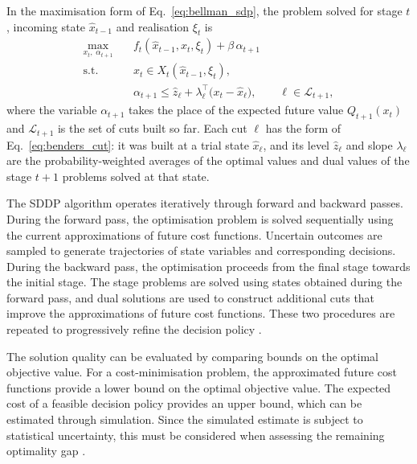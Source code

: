 In the maximisation form of Eq.~\eqref{eq:bellman_sdp}, the problem solved for stage $t$, incoming state $\widehat{x}_{t-1}$ and realisation $\xi_t$ is
\begin{subequations}\label{eq:sddp_stage}
\begin{align}
\max_{x_t,\;\alpha_{t+1}}\quad & f_t(\widehat{x}_{t-1},x_t,\xi_t)+\beta\,\alpha_{t+1}\\
\text{s.t.}\quad & x_t\in X_t(\widehat{x}_{t-1},\xi_t),\\
& \alpha_{t+1}\le\widehat{z}_\ell+\lambda_\ell^{\top}\bigl(x_t-\widehat{x}_\ell\bigr),
\qquad \ell\in\mathcal{L}_{t+1},
\end{align}
\end{subequations}
where the variable $\alpha_{t+1}$ takes the place of the expected future value $Q_{t+1}(x_t)$ and $\mathcal{L}_{t+1}$ is the set of cuts built so far. Each cut $\ell$ has the form of Eq.~\eqref{eq:benders_cut}: it was built at a trial state $\widehat{x}_\ell$, and its level $\widehat{z}_\ell$ and slope $\lambda_\ell$ are the probability-weighted averages of the optimal values and dual values of the stage $t+1$ problems solved at that state.

The SDDP algorithm operates iteratively through forward
and backward passes. During the forward pass, the
optimisation problem is solved sequentially using the
current approximations of future cost functions.
Uncertain outcomes are sampled to generate trajectories
of state variables and corresponding decisions.
During the backward pass, the optimisation proceeds from
the final stage towards the initial stage. The stage
problems are solved using states obtained during the
forward pass, and dual solutions are used to construct
additional cuts that improve the approximations of
future cost functions. These two procedures are repeated
to progressively refine the decision policy
\parencite[pp.~365--368]{pereiraPinto1991}.

The solution quality can be evaluated by comparing
bounds on the optimal objective value. For a
cost-minimisation problem, the approximated future cost
functions provide a lower bound on the optimal objective
value. The expected cost of a feasible decision policy
provides an upper bound, which can be estimated through
simulation. Since the simulated estimate is subject to
statistical uncertainty, this must be considered when
assessing the remaining optimality gap
\parencite[p.~67]{shapiro2011}.

